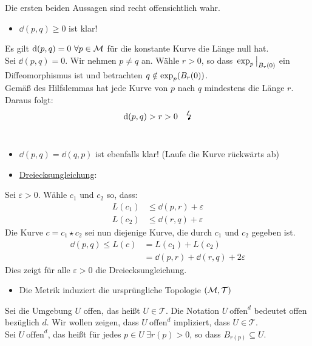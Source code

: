 \begin{bew}
Die ersten beiden Aussagen sind recht offensichtlich wahr.
\begin{itemize}
\item $\dd(p, q) \geq 0$ ist klar! 
\end{itemize}
\vspace{.1cm}
Es gilt $\dd(p, q)=0 \ \forall p \in \mathcal{M}$ für die konstante Kurve die Länge null hat. \\
Sei $\dd(p, q)=0$. Wir nehmen $p\neq q$ an. Wähle $r>0$, so dass $\eval{\expp_p}_{B_r(0)}$ ein Diffeomorphismus ist und betrachten $q \notin \operatorname{exp}_p(B_r(0))$. \\
Gemäß des Hilfslemmas hat jede Kurve von $p$ nach $q$ mindestens die Länge $r$. \\
Daraus folgt: 
\begin{align*}
\dd(p, q) > r > 0 \quad\text{\Large{\lightning}}
\end{align*}\
\begin{itemize}
\item $\dd(p, q) = \dd(q, p)$ ist ebenfalls klar! (Laufe die Kurve rückwärts ab)
\item \underline{Dreiecksungleichung}: 
\end{itemize}
Sei $\varepsilon>0$. Wähle $c_1$ und $c_2$ so, dass:
\begin{align*}
L(c_1) &\leq \dd(p, r) + \varepsilon \\
L(c_2) &\leq \dd(r, q) + \varepsilon
\end{align*}
Die Kurve $c = c_1 \star c_2$ sei nun diejenige Kurve, die durch $c_1$ und $c_2$ gegeben ist.
\begin{align*}
\dd(p, q) \leq L(c) &= L(c_1) + L(c_2) \\
&= \dd(p, r) + \dd(r, q) +2\varepsilon
\end{align*}
Dies zeigt für alle $\varepsilon>0$ die Dreiecksungleichung.
\begin{itemize}
\item Die Metrik induziert die ursprüngliche Topologie $(\mathcal{M}, \mathcal{T})$
\end{itemize}
Sei die Umgebung $U$ offen, das heißt $U \in \mathcal{T}$. Die Notation $U \ \text{offen}^d$ bedeutet offen bezüglich $d$. Wir wollen zeigen, dass $U \ \text{offen}^d$ impliziert, dass $U \in \mathcal{T}$. \\
Sei $U \ \text{offen}^d$, das heißt für jedes $p \in U \  \exists r(p)>0$, so dass $B_{r(p)} \subseteq U$. \\

\end{bew}
